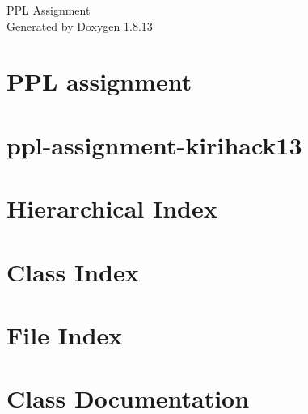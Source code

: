 \documentclass[twoside]{book}
\newcommand{\+}{\discretionary{\mbox{\scriptsize$\hookleftarrow$}}{}{}}
\newcommand{\clearemptydoublepage}{%
  \newpage{\pagestyle{empty}\cleardoublepage}%
}
\begin{document}
\hypersetup{pageanchor=false,
             bookmarksnumbered=true,
             pdfencoding=unicode
            }
\begin{titlepage}
\vspace*{7cm}
\begin{center}%
{\Large P\+PL Assignment }\\
\vspace*{1cm}
{\large Generated by Doxygen 1.8.13}\\
\end{center}
\end{titlepage}
\clearemptydoublepage
{}
\tableofcontents
\clearemptydoublepage
{}
\hypersetup{pageanchor=true}

\chapter{P\+PL assignment}
\label{index}\hypertarget{index}{}
\chapter{ppl-\/assignment-\/kirihack13}
\label{md__r_e_a_d_m_e}

\chapter{Hierarchical Index}

\chapter{Class Index}

\chapter{File Index}

\chapter{Class Documentation}
















\end{document}
